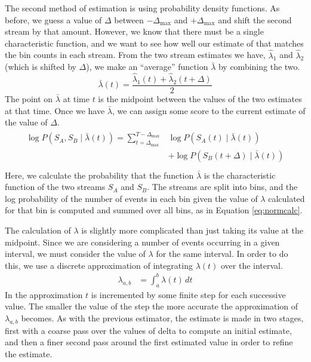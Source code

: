 \documentclass[a4paper,11pt]{article}
\begin{document}
   The second method of estimation is using probability density functions. As
   before, we guess a value of $\Delta$ between $-\Delta_{\text{max}}$ and
   $+\Delta_{\text{max}}$ and shift the second stream by that amount. However, we
   know that there must be a single characteristic function, and we want to see how
   well our estimate of that matches the bin counts in each stream. From the two
   stream estimates we have, $\hat{\lambda}_1$ and $\hat{\lambda}_2$ (which is
   shifted by $\Delta$), we make an ``average'' function $\bar{\lambda}$ by combining the
   two.
   \begin{equation}
   \bar{\lambda}(t)=\frac{\hat{\lambda}_1(t)+\hat{\lambda}_2(t+\Delta)}{2}
   \end{equation}
   The point on $\bar{\lambda}$ at time $t$ is the midpoint between the values of
   the two estimates at that time. Once we have $\bar{\lambda}$, we can assign some
   score to the current estimate of the value of $\Delta$.
   \begin{align}
   \begin{split}
   \log P(S_A,S_B\mid\bar{\lambda}(t))=\sum_{t=\Delta_{\text{max}}}^{T-\Delta_{\text{max}}}&\log P(S_A(t)\mid \bar{\lambda}(t))\\
   &+ \log P(S_B(t+\Delta)\mid \bar{\lambda}(t))\\
   \end{split}
   \end{align}
   Here, we calculate the probability that the function $\bar{\lambda}$ is the
   characteristic function of the two streams $S_A$ and $S_B$. The streams are
   split into bins, and the log probability of the number of events in each bin
   given the value of $\lambda$ calculated for that bin is computed and summed
   over all bins, as in Equation \eqref{eq:normcalc}.

   The calculation of $\lambda$ is slightly more complicated than just taking
   its value at the midpoint. Since we are considering a number of events
   occurring in a given interval, we must consider the value of $\lambda$ for the
   same interval. In order to do this, we use a discrete approximation of
   integrating $\lambda(t)$ over the interval.
   \begin{align}
   \lambda_{a,b}&=\int_a^b\lambda(t)\,dt
   \end{align}
   In the approximation $t$ is incremented by some finite step for each
   successive value. The smaller the value of the step the more accurate the
   approximation of $\lambda_{a,b}$ becomes. As with the previous estimator, the
   estimate is made in two stages, first with a coarse pass over the values of
   delta to compute an initial estimate, and then a finer second pass around the
   first estimated value in order to refine the estimate.
\end{document}
